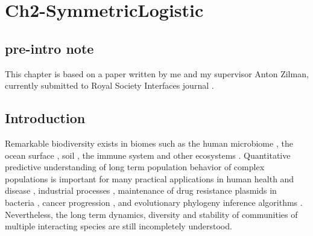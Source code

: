 \chapter{Ch2-SymmetricLogistic}

\iffalse
"strategic lit review"
"gap"
"thesis" "in this paper I will..."
"roadmap"
"short significance"
\fi


\section*{pre-intro note}
This chapter is based on a paper written by me and my supervisor Anton Zilman, currently submitted to Royal Society Interfaces journal \cite{Badali2018}. 

\section{Introduction}

Remarkable biodiversity exists in biomes such as the human microbiome \cite{Korem2015,Coburn2015,Palmer2001}, the ocean surface \cite{Hutchinson1961,Cordero2016}, soil \cite{Friedman2016}, the immune system \cite{Weinstein2009,Desponds2015,Stirk2010} and other ecosystems \cite{Tilman1996,Naeem2001}. 
Quantitative predictive understanding of long term population behavior of complex populations is important for many practical applications in human health and disease \cite{Coburn2015,Palmer2001,Kinross2011}, industrial processes \cite{Wolfe2014}, maintenance of drug resistance plasmids in bacteria \cite{Gooding-townsend2015}, cancer progression \cite{Ashcroft2015}, and evolutionary phylogeny inference algorithms \cite{Kingman1982,Rice2004,Blythe2007}. 
Nevertheless, the long term dynamics, diversity and stability of communities of multiple interacting species are still incompletely understood.

